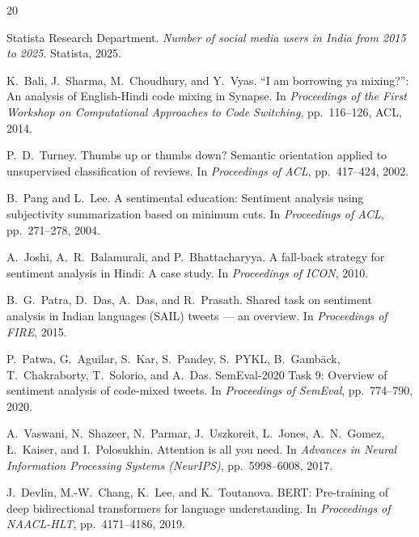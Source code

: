 \documentclass[12pt,a4paper]{report}
\begin{document}
\begin{thebibliography}{20}

Statista Research Department.
\newblock \textit{Number of social media users in India from 2015 to 2025}.
\newblock Statista, 2025.

K.\ Bali, J.\ Sharma, M.\ Choudhury, and Y.\ Vyas.
\newblock ``I am borrowing ya mixing?'': An analysis of English-Hindi code mixing in Synapse.
\newblock In \textit{Proceedings of the First Workshop on Computational Approaches to Code Switching}, pp.\ 116--126, ACL, 2014.

P.\ D.\ Turney.
\newblock Thumbs up or thumbs down? Semantic orientation applied to unsupervised classification of reviews.
\newblock In \textit{Proceedings of ACL}, pp.\ 417--424, 2002.

B.\ Pang and L.\ Lee.
\newblock A sentimental education: Sentiment analysis using subjectivity summarization based on minimum cuts.
\newblock In \textit{Proceedings of ACL}, pp.\ 271--278, 2004.

A.\ Joshi, A.\ R.\ Balamurali, and P.\ Bhattacharyya.
\newblock A fall-back strategy for sentiment analysis in Hindi: A case study.
\newblock In \textit{Proceedings of ICON}, 2010.

B.\ G.\ Patra, D.\ Das, A.\ Das, and R.\ Prasath.
\newblock Shared task on sentiment analysis in Indian languages (SAIL) tweets — an overview.
\newblock In \textit{Proceedings of FIRE}, 2015.

P.\ Patwa, G.\ Aguilar, S.\ Kar, S.\ Pandey, S.\ PYKL, B.\ Gambäck, T.\ Chakraborty, T.\ Solorio, and A.\ Das.
\newblock SemEval-2020 Task 9: Overview of sentiment analysis of code-mixed tweets.
\newblock In \textit{Proceedings of SemEval}, pp.\ 774--790, 2020.

A.\ Vaswani, N.\ Shazeer, N.\ Parmar, J.\ Uszkoreit, L.\ Jones, A.\ N.\ Gomez, Ł.\ Kaiser, and I.\ Polosukhin.
\newblock Attention is all you need.
\newblock In \textit{Advances in Neural Information Processing Systems (NeurIPS)}, pp.\ 5998--6008, 2017.

J.\ Devlin, M.-W.\ Chang, K.\ Lee, and K.\ Toutanova.
\newblock BERT: Pre-training of deep bidirectional transformers for language understanding.
\newblock In \textit{Proceedings of NAACL-HLT}, pp.\ 4171--4186, 2019.


\end{thebibliography}
\end{document}
